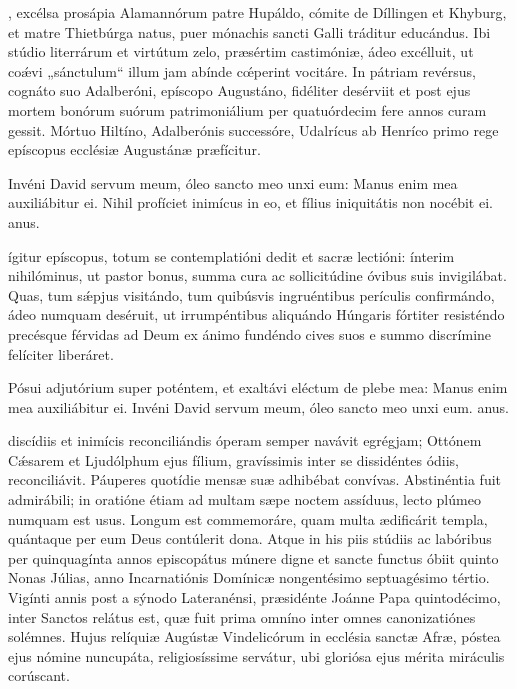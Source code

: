\documentclass[fontsize=9pt,paper=A6,twoside,BCOR=1mm,DIV=22,headinclude]{scrarticle}
\begin{document}
\begin{multicols}{2}
, excélsa prosápia Alamannórum patre Hupáldo, cómite de Díllingen et Khyburg, et matre Thietbúrga natus, puer mónachis sancti Galli tráditur educándus. Ibi stúdio literrárum et virtútum zelo, præsértim castimóniæ, ádeo excélluit, ut co\'ævi „sánctulum“ illum jam abínde c\'œperint vocitáre. In pátriam revérsus, cognáto suo Adalberóni, epíscopo Augustáno, fidéliter desérviit et post ejus mortem bonórum suórum patrimoniálium per quatuórdecim fere annos curam gessit. Mórtuo Hiltíno, Adalberónis successóre, Udalrícus ab Henríco primo rege epíscopus ecclésiæ Augustánæ præfícitur.

\R Invéni David servum meum, óleo sancto meo unxi eum: \red{*} Manus enim mea auxiliábitur ei.
\V Nihil profíciet inimícus in eo, et fílius iniquitátis non nocébit ei. anus.

 ígitur epíscopus, totum se contemplatióni dedit et sacræ lectióni: ínterim nihilóminus, ut pastor bonus, summa cura ac sollicitúdine óvibus suis invigilábat. Quas, tum s\'æpjus visitándo, tum quibúsvis ingruéntibus perículis confirmándo, ádeo numquam deséruit, ut irrumpéntibus aliquándo Húngaris fórtiter resisténdo precésque férvidas ad Deum ex ánimo fundéndo cives suos e summo discrímine felíciter liberáret.

\R Pósui adjutórium super poténtem, et exaltávi eléctum de plebe mea: \red{*} Manus enim mea auxiliábitur ei.
\V Invéni David servum meum, óleo sancto meo unxi eum. anus.

 discídiis et inimícis reconciliándis óperam semper navávit egrégjam; Ottónem C\'æsarem et Ljudólphum ejus fílium, gravíssimis inter se dissidéntes ódiis, reconciliávit. Páuperes quotídie mensæ suæ adhibébat convívas. Abstinéntia fuit admirábili; in oratióne étiam ad multam sæpe noctem assíduus, lecto plúmeo numquam est usus. Longum est commemoráre, quam multa ædificárit templa, quántaque per eum Deus contúlerit dona. Atque in his piis stúdiis ac labóribus per quinquagínta annos episcopátus múnere digne et sancte functus óbiit quinto Nonas Júlias, anno Incarnatiónis Domínicæ nongentésimo septuagésimo tértio. Vigínti annis post a sýnodo Lateranénsi, præsidénte Joánne Papa quintodécimo, inter Sanctos relátus est, quæ fuit prima omníno inter omnes canonizatiónes solémnes. Hujus relíquiæ Augústæ Vindelicórum in ecclésia sanctæ Afræ, póstea ejus nómine nuncupáta, religiosíssime servátur, ubi gloriósa ejus mérita miráculis corúscant.


\end{multicols}
\end{document}
